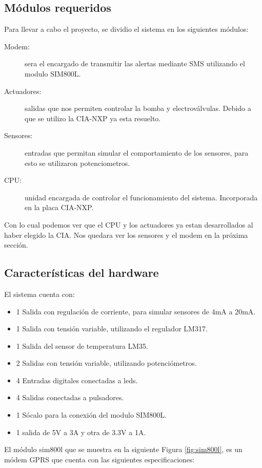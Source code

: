 \begin{itemize}
\subsection{ Módulos requeridos}
Para llevar a cabo el proyecto, se dividio el sistema en los siguientes módulos:
\begin{description}
  \item[Modem:] sera el encargado de transmitir las alertas mediante SMS utilizando el modulo SIM800L.
  \item[Actuadores:] salidas que nos permiten controlar la bomba y electroválvulas. Debido a que se utilizo la CIA-NXP ya esta resuelto.
  \item[Sensores:] entradas que permitan simular el comportamiento de los sensores, para esto se utilizaron potenciometros.
  \item[CPU:] unidad encargada de controlar el funcionamiento del sistema. Incorporada en la placa CIA-NXP. 
\end{description}

Con lo cual podemos ver que el CPU y los actuadores ya estan desarrollados al haber elegido la CIA. Nos quedara ver los sensores y el modem en la próxima sección.

\subsection{Características del hardware}
El sistema cuenta con:

\begin{itemize}
  \item 1 Salida con regulación de corriente, para simular sensores de 4mA a 20mA.
  \item 1 Salida con tensión variable, utilizando el regulador LM317.
  \item 1 Salida del sensor de temperatura LM35.
  \item 2 Salidas con tensión variable, utilizando potenciómetros. 
  \item 4 Entradas digitales conectadas a leds.
  \item 4 Salidas conectadas a pulsadores. 
  \item 1 Sócalo para la conexión del modulo SIM800L. 
  \item 1 salida de 5V a 3A y otra de 3.3V a 1A. 
\end{itemize}

El módulo sim800l que se muestra en la siguiente Figura \ref{fig:sim800l}, es un módem GPRS que cuenta con las siguientes especificaciones:


\end{itemize}
